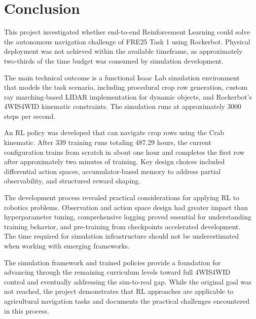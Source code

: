 \documentclass[11pt,a4paper,twocolumn]{article}
\begin{document}
\section{Conclusion}

This project investigated whether end-to-end Reinforcement Learning could solve the autonomous navigation challenge of FRE25 Task 1 using Rockerbot. Physical deployment was not achieved within the available timeframe, as approximately two-thirds of the time budget was consumed by simulation development.

The main technical outcome is a functional Isaac Lab simulation environment that models the task scenario, including procedural crop row generation, custom ray marching-based LIDAR implementation for dynamic objects, and Rockerbot's 4WIS4WID kinematic constraints. The simulation runs at approximately 3000 steps per second.

An RL policy was developed that can navigate crop rows using the Crab kinematic. After 339 training runs totaling 487.29 hours, the current configuration trains from scratch in about one hour and completes the first row after approximately two minutes of training. Key design choices included differential action spaces, accumulator-based memory to address partial observability, and structured reward shaping.

The development process revealed practical considerations for applying RL to robotics problems. Observation and action space design had greater impact than hyperparameter tuning, comprehensive logging proved essential for understanding training behavior, and pre-training from checkpoints accelerated development. The time required for simulation infrastructure should not be underestimated when working with emerging frameworks.

The simulation framework and trained policies provide a foundation for advancing through the remaining curriculum levels toward full 4WIS4WID control and eventually addressing the sim-to-real gap. While the original goal was not reached, the project demonstrates that RL approaches are applicable to agricultural navigation tasks and documents the practical challenges encountered in this process.


\end{document}
